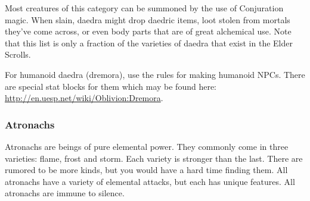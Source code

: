 \documentclass[12pt]{book}
\begin{document}
Most creatures of this category can be summoned by the use of Conjuration magic. When slain, daedra might drop daedric items, loot stolen from mortals they've come across, or even body parts that are of great alchemical use. Note that this list is only a fraction of the varieties of daedra that exist in the Elder Scrolls.

For humanoid daedra (dremora), use the rules for making humanoid NPCs. There are special stat blocks for them which may be found here: \url{http://en.uesp.net/wiki/Oblivion:Dremora}.

\subsubsection{Atronachs}
Atronachs are beings of pure elemental power. They commonly come in three varieties: flame, frost and storm. Each variety is stronger than the last. There are rumored to be more kinds, but you would have a hard time finding them. All atronachs have a variety of elemental attacks, but each has unique features. All atronachs are immune to silence.
\end{document}
